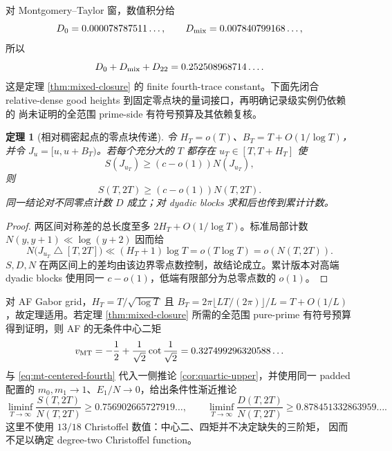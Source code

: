 \documentclass[UTF8,11pt,a4paper]{ctexart}
\newtheorem{theorem}{定理}[section]
\theoremstyle{definition}
\theoremstyle{remark}
\begin{document}
对 Montgomery--Taylor 窗，数值积分给
\[
 D_0=0.000078787511\ldots,\qquad
 D_{\rm mix}=0.007840799168\ldots,
\]
所以
\[
 D_0+D_{\rm mix}+D_{22}
 =0.252508968714\ldots.
 \label{eq:mt-centered-fourth}
\]
这是定理 \ref{thm:mixed-closure} 的 finite fourth-trace constant。下面先闭合
relative-dense good heights 到固定零点块的量词接口，再明确记录级实例仍依赖的
尚未证明的全范围 prime-side 有符号预算及其依赖复核。

\begin{theorem}[相对稠密起点的零点块传递]\label{thm:moving-block}
令 $H_T=o(T)$、$B_T=T+O(1/\log T)$，并令
$J_u=[u,u+B_T)$。若每个充分大的 $T$ 都存在
$u_T\in[T,T+H_T]$ 使
\[
 S(J_{u_T})\ge(c-o(1))N(J_{u_T}),
\]
则
\[
 S(T,2T)\ge(c-o(1))N(T,2T).
\]
同一结论对不同零点计数 $D$ 成立；对 dyadic blocks 求和后也传到累计计数。
\end{theorem}

\begin{proof}
两区间对称差的总长度至多 $2H_T+O(1/\log T)$。标准局部计数
$N(y,y+1)\ll\log(y+2)$ 因而给
\[
 N\bigl(J_{u_T}\mathbin\triangle[T,2T]\bigr)
 \ll(H_T+1)\log T=o(T\log T)=o(N(T,2T)).
\]
$S,D,N$ 在两区间上的差均由该边界零点数控制，故结论成立。累计版本对高端
dyadic blocks 使用同一 $c-o(1)$，低端有限部分为总零点数的 $o(1)$。
\end{proof}

对 AF Gabor grid，$H_T=T/\sqrt{\log T}$ 且
$B_T=2\pi\lfloor LT/(2\pi)\rfloor/L=T+O(1/L)$，故定理适用。若定理
\ref{thm:mixed-closure} 所需的全范围 pure-prime 有符号预算得到证明，则 AF 的无条件中心二矩
\[
 v_{\rm MT}=-\frac12+\frac1{\sqrt2}\cot\frac1{\sqrt2}
 =0.327499296320588\ldots
\]
与 \eqref{eq:mt-centered-fourth} 代入一侧推论 \ref{cor:quartic-upper}，并使用同一 padded 配置的 $m_0,m_1\to1$、$E_1/N\to0$，给出条件性渐近推论
\[
 \liminf_{T\to\infty}\frac{S(T,2T)}{N(T,2T)}\ge0.756902665727919\ldots,
 \qquad
 \liminf_{T\to\infty}\frac{D(T,2T)}{N(T,2T)}\ge0.878451332863959\ldots.
 \label{eq:conditional-mt-quartic}
\]
这里不使用 $13/18$ Christoffel 数值：中心二、四矩并不决定缺失的三阶矩，
因而不足以确定 degree-two Christoffel function。
\end{document}
